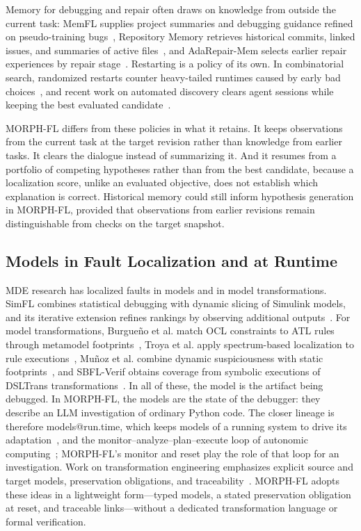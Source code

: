 \documentclass[letterpaper,journal]{IEEEtran}
\newcommand{\tool}{MORPH-FL}
\begin{document}
Memory for debugging and repair often draws on knowledge from outside the current task: MemFL supplies project summaries and debugging guidance refined on pseudo-training bugs~\cite{memfl2025}, Repository Memory retrieves historical commits, linked issues, and summaries of active files~\cite{repomem2026}, and AdaRepair-Mem selects earlier repair experiences by repair stage~\cite{adarepair2026}. Restarting is a policy of its own. In combinatorial search, randomized restarts counter heavy-tailed runtimes caused by early bad choices~\cite{restarts1998}, and recent work on automated discovery clears agent sessions while keeping the best evaluated candidate~\cite{forgetting2026}.

\tool{} differs from these policies in what it retains. It keeps observations from the current task at the target revision rather than knowledge from earlier tasks. It clears the dialogue instead of summarizing it. And it resumes from a portfolio of competing hypotheses rather than from the best candidate, because a localization score, unlike an evaluated objective, does not establish which explanation is correct. Historical memory could still inform hypothesis generation in \tool{}, provided that observations from earlier revisions remain distinguishable from checks on the target snapshot.

\subsection{Models in Fault Localization and at Runtime}\label{sec:related_mde}
MDE research has localized faults in models and in model transformations. SimFL combines statistical debugging with dynamic slicing of Simulink models, and its iterative extension refines rankings by observing additional outputs~\cite{simfl2016}. For model transformations, Burgue\~no et al. match OCL constraints to ATL rules through metamodel footprints~\cite{mtstaticfl2015}, Troya et al. apply spectrum-based localization to rule executions~\cite{mtspectrum2018}, Mu\~noz et al. combine dynamic suspiciousness with static footprints~\cite{mthybrid2022}, and SBFL-Verif obtains coverage from symbolic executions of DSLTrans transformations~\cite{mtsymbolic2024}. In all of these, the model is the artifact being debugged. In \tool{}, the models are the state of the debugger: they describe an LLM investigation of ordinary Python code. The closer lineage is therefore models@run.time, which keeps models of a running system to drive its adaptation~\cite{modelsruntime2009}, and the monitor--analyze--plan--execute loop of autonomic computing~\cite{mapek2003}; \tool{}'s monitor and reset play the role of that loop for an investigation. Work on transformation engineering emphasizes explicit source and target models, preservation obligations, and traceability~\cite{mtanalysis2017,lifting2014,mttrace2024}. \tool{} adopts these ideas in a lightweight form---typed models, a stated preservation obligation at reset, and traceable links---without a dedicated transformation language or formal verification.
\end{document}
